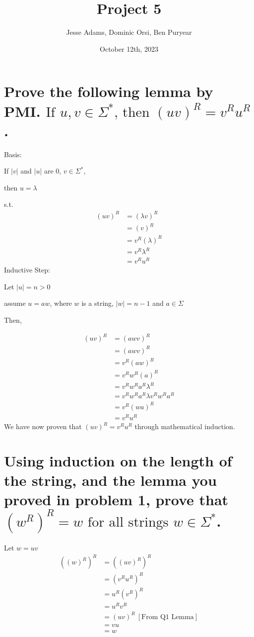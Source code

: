 \documentclass{article}
\title{Project 5}
\author{Jesse Adams, Dominic Orsi, Ben Puryear}
\date{October 12th, 2023}
\begin{document}
\maketitle

\section{Prove the following lemma by PMI. $\text{If } u,v \in \Sigma^* \text{, then }(uv)^R =v^Ru^R$.}

Basis: 

    If $|v|$ and $|u|$ are $0$, $v \in \Sigma^*$, 

    then $u = \lambda$ 

    s.t. 
\begin{align*}
    (uv)^R &= (\lambda v)^R \\
    &= (v)^R \\
    &= v^R (\lambda)^R \\
    &= v^R \lambda^R \\
    &= v^R u^R
\end{align*}
\newline
Inductive Step:

Let $|u| = n > 0$

assume $u = aw$, where $w$ is a string, $|w| = n - 1$ and $a \in \Sigma$

Then, 

\begin{align*}
    (uv)^R &= (awv)^R \\
    &= (awv)^R \\
    &= v^R (aw)^R \\
    &=v^R w^R (a)^R \\
    &=v^R w^R a^R \lambda^R \\
    &=v^R w^R a^R \lambda v^R w^R a^R \\
    &=v^R (wa)^R \\
    &=v^R u^R
\end{align*}
We have now proven that $(uv)^R = v^R u^R$ through mathematical induction.

\section{Using induction on the length of the string, and the lemma you proved in problem 1, prove that $(w^R)^R = w \text{ for all strings } w \in \Sigma ^*$.}

Let $w = uv$
\begin{align*}
    ((w)^R)^R &= ((uv)^R)^R \\
    &= (v^R u^R)^R \\
    &= u^R (v^R)^R \\
    &= u^R v^R \\
    &= (uv)^R \ [\text{From Q1 Lemma}]\\
    &=vu \\
    &= w
\end{align*}
\end{document}
